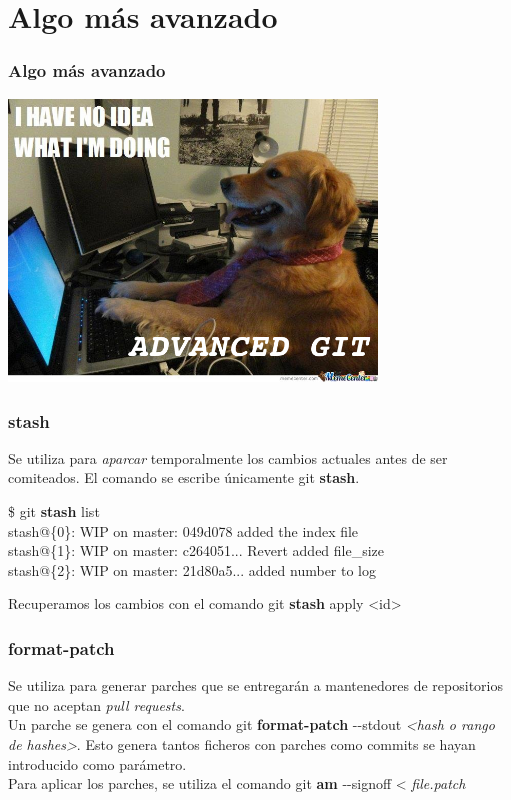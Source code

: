 \section{Algo más avanzado}
\frame
{
\frametitle{Algo más avanzado}
\begin{center}
  \includegraphics[height=7.5cm]{imgs/noidea.jpg}
\end{center}
}

\frame
{
\frametitle{stash}
 Se utiliza para \textit{aparcar} temporalmente los cambios actuales antes de ser comiteados. El comando se escribe únicamente git \textbf{stash}.
 \begin{framed}
 \$ git \textbf{stash} list\\
 stash@\{0\}: WIP on master: 049d078 added the index file\\
 stash@\{1\}: WIP on master: c264051... Revert added file\_size\\
 stash@\{2\}: WIP on master: 21d80a5... added number to log
 \end{framed}
 
 Recuperamos los cambios con el comando git \textbf{stash} apply <id>
}

\frame
{
\frametitle{format-patch}
 Se utiliza para generar parches que se entregarán a mantenedores de repositorios que no aceptan \textit{pull requests}.\\ \vspace{0.2cm}
 Un parche se genera con el comando git \textbf{format-patch} -{}-stdout \textit{<hash o rango de hashes>}. Esto genera tantos ficheros con parches como commits se hayan introducido como parámetro.\\ \vspace{0.2cm}
 Para aplicar los parches, se utiliza el comando git \textbf{am} -{}-signoff < \textit{file.patch}
}


